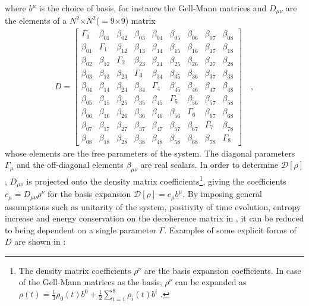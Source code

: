 %
where $b^\mu$ is the choice of basis, for instance the Gell-Mann matrices and $D_{\mu\nu}$ are the elements of a $N^2$$\times$$N^2$($=9$$\times$$9$) matrix \cite{QD_Stutt_Jens_2020}
%
\begin{align} \label{decoherence-matrix}
   D = \begin{bmatrix}
\Gamma_0 & \beta_{01} & \beta_{02} & \beta_{03} & \beta_{04} & \beta_{05} & \beta_{06} & \beta_{07} & \beta_{08} \\
\beta_{01} & \Gamma_1 & \beta_{12} & \beta_{13} & \beta_{14} & \beta_{15} & \beta_{16} & \beta_{17} & \beta_{18} \\
\beta_{02} & \beta_{12} & \Gamma_2 & \beta_{23} & \beta_{24} & \beta_{25} & \beta_{26} & \beta_{27} & \beta_{28} \\
\beta_{03} & \beta_{13} & \beta_{23} & \Gamma_3 & \beta_{34} & \beta_{35} & \beta_{36} & \beta_{37} & \beta_{38} \\
\beta_{04} & \beta_{14} & \beta_{24} & \beta_{34} & \Gamma_4 & \beta_{45} & \beta_{46} & \beta_{47} & \beta_{48} \\
\beta_{05} & \beta_{15} & \beta_{25} & \beta_{35} & \beta_{45} & \Gamma_5 & \beta_{56} & \beta_{57} & \beta_{58} \\
\beta_{06} & \beta_{16} & \beta_{26} & \beta_{36} & \beta_{46} & \beta_{56} & \Gamma_6 & \beta_{67} & \beta_{68} \\
\beta_{07} & \beta_{17} & \beta_{27} & \beta_{37} & \beta_{47} & \beta_{57} & \beta_{67} & \Gamma_7 & \beta_{78} \\
\beta_{08} & \beta_{18} & \beta_{28} & \beta_{38} & \beta_{48} & \beta_{58} & \beta_{68} & \beta_{78} & \Gamma_8 
\end{bmatrix} \quad ,
\end{align}
%
whose elements are the free parameters of the system. The diagonal parameters $\Gamma_\mu$ and the off-diagonal elements $\beta_{\mu\nu}$ are real scalars. In order to determine $\mathcal{D}[\rho]$, $D_{\mu\nu}$ is projected onto the density matrix coefficients\footnote{The density matrix coefficients $\rho^\nu$ are the basis expansion coefficients. In case of the Gell-Mann matrices as the basis, $\rho^\nu$ can be expanded as $ \rho(t) = \frac{1}{3}\rho_0(t) b^0 + \frac{1}{2}\sum_{i=1}^8\rho_i(t) b^i$ \cite{Buoninfante:2020iyr}.}, giving the coefficients $c_\mu = D_{\mu\nu}\rho^\nu$ for the basis expansion $\mathcal{D}[\rho] = c_\mu b^\mu$. 
By imposing general assumptions such as unitarity of the system, positivity of time evolution, entropy increase and energy conservation \cite{DeRomeri:2023dht} on the decoherence matrix in , it can be reduced to being dependent on a single parameter $\Gamma$. Examples of some explicit forms of $D$ \cite{QD_Stutt_Jens_2020} are shown in :
